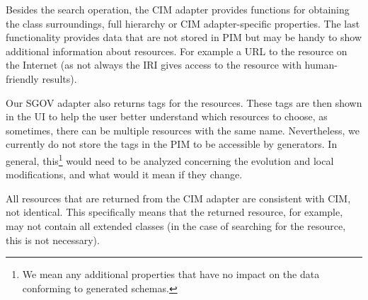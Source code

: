 Besides the search operation, the CIM adapter provides functions for obtaining the class surroundings, full hierarchy or CIM adapter-specific properties. The last functionality provides data that are not stored in PIM but may be handy to show additional information about resources. For example a URL to the resource on the Internet (as not always the IRI gives access to the resource with human-friendly results).

Our SGOV adapter also returns tags for the resources. These tags are then shown in the UI to help the user better understand which resources to choose, as sometimes, there can be multiple resources with the same name. Nevertheless, we currently do not store the tags in the PIM to be accessible by generators. In general, this\footnote{We mean any additional properties that have no impact on the data conforming to generated schemas.} would need to be analyzed concerning the evolution and local modifications, and what would it mean if they change.

\medskip

All resources that are returned from the CIM adapter are consistent with CIM, not identical. This specifically means that the returned resource, for example, may not contain all extended classes (in the case of searching for the resource, this is not necessary).